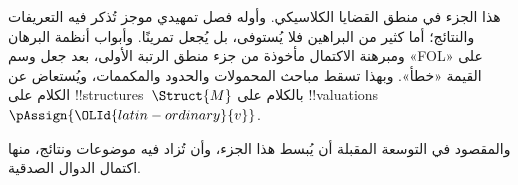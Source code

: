 \documentclass[../../include/open-logic-part]{subfiles}
\begin{document}

\begin{editorial}
  هذا الجزء في منطق القضايا الكلاسيكي. وأوله فصل تمهيدي موجز تُذكر فيه التعريفات والنتائج؛ أما كثير من البراهين فلا يُستوفى، بل يُجعل تمرينًا. وأبواب أنظمة البرهان ومبرهنة الاكتمال مأخوذة من جزء منطق الرتبة الأولى، بعد جعل وسم «FOL» على القيمة «خطأ». وبهذا تسقط مباحث المحمولات والحدود والمكممات، ويُستعاض عن الكلام على
  !!{structure}s~$\Struct{M}$ بالكلام على
  !!{valuation}s~$\pAssign{\OLId{latin-ordinary}{v}}$.

  والمقصود في التوسعة المقبلة أن يُبسط هذا الجزء، وأن تُزاد فيه موضوعات ونتائج، منها اكتمال الدوال الصدقية.
\end{editorial}










\OLEndPartHook
\end{document}
